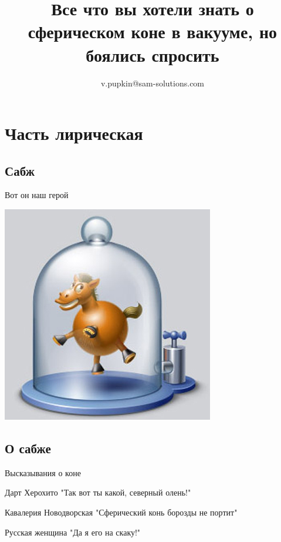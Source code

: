 \documentclass[ignorenonframetext,hyperref={pdftex,unicode}]{beamer}
\title{Все что вы хотели знать о сферическом коне в вакууме, но боялись спросить} %
\author[Vasia]{v.pupkin@sam-solutions.com} %
\begin{document}

\frame{\titlepage} %


\section{Часть лирическая} %
\subsection{Сабж} %

\begin{frame}{Вот он наш герой} %
	\begin{center}
 		\includegraphics[height=.8\textheight]{Sphere_horse} %
	\end{center}
\end{frame} %

\subsection{О сабже}
\begin{frame}{Высказывания о коне}
	\pause    %
	\begin{block}{Дарт Херохито}
 		"Так вот ты какой, северный олень!"
	\end{block}
	\pause
	\begin{block}{Кавалерия Новодворская}
 		"Сферический конь борозды не портит"
	\end{block}
	\pause
	\begin{block}{Русская женщина}
 		"Да я его на скаку!"
	\end{block}
\end{frame}
\end{document}
